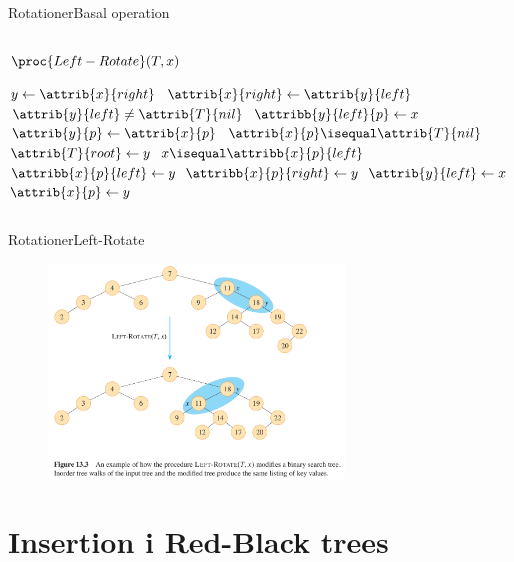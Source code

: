 \documentclass[aspectratio=1610]{beamer}
\begin{document}
\begin{frame}{Rotationer}{Basal operation}
\begin{columns}
        \begin{block}{$\proc{Left-Rotate}(T,x)$}
            \footnotesize
        
            \vspace{-\abovedisplayskip}
            \begin{codebox}
                \li $y \gets \attrib{x}{right}$ 
                \li $\attrib{x}{right} \gets \attrib{y}{left}$
                \li \If $\attrib{y}{left} \neq \attrib{T}{nil}$ \Then
                \li     $\attribb{y}{left}{p} \gets x$ 
                    \End
                \li $\attrib{y}{p} \gets \attrib{x}{p}$ 
                \li \If $\attrib{x}{p} \isequal \attrib{T}{nil}$ 
                    \Then
                \li     $\attrib{T}{root} \gets y$
                \li \ElseIf $x \isequal \attribb{x}{p}{left}$ 
                    \Then
                \li     $\attribb{x}{p}{left} \gets y$ 
                \li \Else $\attribb{x}{p}{right} \gets y$
                    \End
                \li $\attrib{y}{left} \gets x$ 
                \li $\attrib{x}{p} \gets y$ 
            \end{codebox}
        \end{block}
    \end{columns}
\end{frame}


\begin{frame}{Rotationer}{Left-Rotate}
    \begin{figure}[h]
        \centering
        \includegraphics[width=0.7\textwidth]{left-rotate}
    \end{figure}
\end{frame}


\section{Insertion i Red-Black trees}
\end{document}

